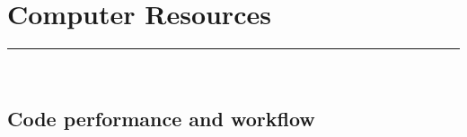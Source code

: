 \documentclass [a4paper, 12pt]{article}
\begin{document}
\section{Computer Resources}
\rule{\textwidth}{0.4pt}\\
\subsection{Code performance and workflow}
\end{document}
